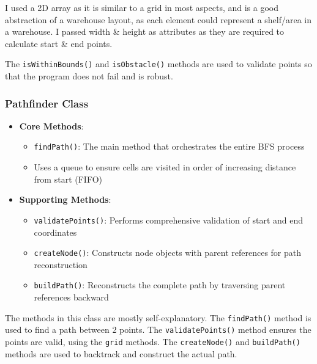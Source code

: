 I used a 2D array as it is similar to a grid in most aspects, and is a good abstraction of a warehouse layout, as each element could represent a shelf/area in a warehouse. I passed width \& height as attributes as they are required to calculate start \& end points.

The \verb|isWithinBounds()| and \verb|isObstacle()| methods are used to validate points so that the program does not fail and is robust.

\subsubsection{Pathfinder Class}
\begin{itemize}
    \item \textbf{Core Methods}:
    \begin{itemize}
        \item \texttt{findPath()}: The main method that orchestrates the entire BFS process
        \item Uses a queue to ensure cells are visited in order of increasing distance from start (FIFO)
    \end{itemize}
    \item \textbf{Supporting Methods}:
    \begin{itemize}
        \item \texttt{validatePoints()}: Performs comprehensive validation of start and end coordinates
        \item \texttt{createNode()}: Constructs node objects with parent references for path reconstruction
        \item \texttt{buildPath()}: Reconstructs the complete path by traversing parent references backward
    \end{itemize}
\end{itemize}

The methods in this class are mostly self-explanatory. The \verb|findPath()| method is used to find a path between 2 points. The \verb|validatePoints()| method ensures the points are valid, using the \verb|grid| methods. The \verb|createNode()| and \verb|buildPath()| methods are used to backtrack and construct the actual path.

